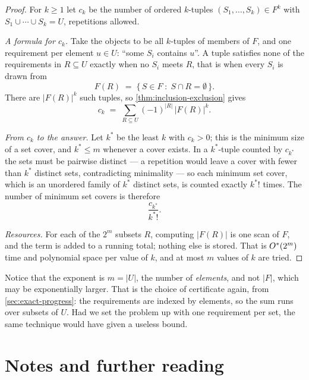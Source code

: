 \begin{proof}
For $k \ge 1$ let $c_k$ be the number of ordered $k$-tuples
$(S_1, \ldots, S_k) \in F^k$ with $S_1 \cup \cdots \cup S_k = U$, repetitions
allowed.

\emph{A formula for $c_k$.} Take the objects to be all $k$-tuples of members of
$F$, and one requirement per element $u \in U$: ``some $S_i$ contains $u$''. A
tuple satisfies none of the requirements in $R \subseteq U$ exactly when no
$S_i$ meets $R$, that is when every $S_i$ is drawn from
\[ F(R) \;=\; \{\, S \in F \;:\; S \cap R = \emptyset \,\}. \]
There are $|F(R)|^k$ such tuples, so \cref{thm:inclusion-exclusion} gives
\[ c_k \;=\; \sum_{R \subseteq U} (-1)^{|R|}\, |F(R)|^{k}. \]

\emph{From $c_k$ to the answer.} Let $k^{*}$ be the least $k$ with $c_k > 0$;
this is the minimum size of a set cover, and $k^{*} \le m$ whenever a cover
exists. In a $k^{*}$-tuple counted by $c_{k^{*}}$ the sets must be pairwise
distinct --- a repetition would leave a cover with fewer than $k^{*}$ distinct
sets, contradicting minimality --- so each minimum set cover, which is an
unordered family of $k^{*}$ distinct sets, is counted exactly $k^{*}!$ times.
The number of minimum set covers is therefore
\[ \frac{c_{k^{*}}}{k^{*}!}. \]

\emph{Resources.} For each of the $2^m$ subsets $R$, computing $|F(R)|$ is one
scan of $F$, and the term is added to a running total; nothing else is stored.
That is $O^{*}(2^m)$ time and polynomial space per value of $k$, and at most
$m$ values of $k$ are tried.
\end{proof}

\begin{intuition}
Notice that the exponent is $m = |U|$, the number of \emph{elements}, and not
$|F|$, which may be exponentially larger. That is the choice of certificate
again, from \cref{sec:exact-progress}: the requirements are indexed by
elements, so the sum runs over subsets of $U$. Had we set the problem up with
one requirement per set, the same technique would have given a useless bound.
\end{intuition}

\section{Notes and further reading}
\label{sec:exact-ii-further-reading}

